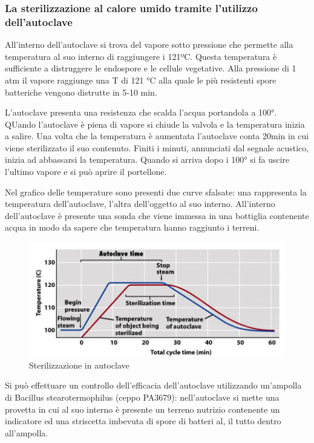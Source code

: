 \documentclass[11pt]{book}
\begin{document}
\subsubsection{La sterilizzazione al calore umido tramite l'utilizzo dell’autoclave}

All'interno dell'autoclave si trova del vapore sotto pressione che permette alla temperatura al suo interno di raggiungere i 121ºC. Questa temperatura è sufficiente a distruggere le endospore e le cellule vegetative.
Alla pressione di 1 atm il vapore raggiunge una T di 121 °C alla quale le più resistenti spore batteriche vengono distrutte in 5-10 min. 

L'autoclave presenta una resistenza che scalda l’acqua portandola a 100°. QUando l'autoclave è piena di vapore si chiude la valvola e la temperatura inizia a salire. Una volta che la temperatura è aumentata l’autoclave conta 20min in cui viene sterilizzato il suo contenuto. Finiti i minuti, annunciati dal segnale acustico, inizia ad abbassarsi la temperatura. Quando si arriva dopo i 100° si fa uscire l’ultimo vapore e si può aprire il portellone.

Nel grafico delle temperature sono presenti due curve sfalsate: una rappresenta la temperatura dell’autoclave, l’altra dell’oggetto al suo interno. All’interno dell’autoclave è presente una sonda che viene immessa in una bottiglia contenente acqua in modo da sapere che temperatura hanno raggiunto i terreni. 

\begin{figure}[htp]
\centering
\includegraphics[scale=0.5]{img/Autoclave.png}
\caption{Sterilizzazione in autoclave}
\label{}
\end{figure}

Si può effettuare un controllo dell’efficacia dell'autoclave utilizzando un'ampolla di Bacillus stearotermophilus (ceppo PA3679): nell'autoclave si mette una provetta in cui al suo interno è presente un terreno nutrizio contenente un indicatore ed una striscetta imbevuta di spore di batteri al, il tutto dentro all'ampolla. 
\end{document}
